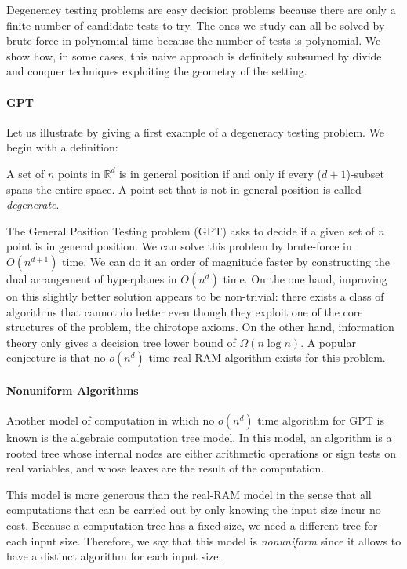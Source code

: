 Degeneracy testing problems are easy decision problems because there are only
a finite number of candidate tests to try. The ones we study can all be solved
by brute-force in polynomial time because the number of tests is polynomial.
We show how, in some cases, this naive approach is definitely subsumed by
divide and conquer techniques exploiting the geometry of the setting.

\paragraph{GPT}
Let us illustrate by giving a first example of a degeneracy testing problem. We
begin with a definition:

\begin{definition}
A set of \(n\) points in \(\mathbb{R}^d\)
is in general position if and only if every (\(d+1\))-subset spans the entire
space. A point set that is not in general position is called \emph{degenerate}.
\end{definition}

The General Position Testing problem (GPT) asks to decide if a given set of
\(n\) point is in general position. We can solve this problem by brute-force in
\(O(n^{d+1})\) time.
We can do it an order of magnitude faster
by constructing the dual arrangement of hyperplanes in
\(O(n^d)\) time.
On the one hand,
improving on this slightly better solution appears to be non-trivial: there
exists a class of algorithms that cannot do better even though they
exploit one of the core structures of the problem, the chirotope axioms.
On the other hand, information theory only gives a decision tree
lower bound of \(\Omega(n \log n)\).
A popular conjecture is that no \(o(n^d)\) time real-RAM
algorithm exists for this problem.

\paragraph{Nonuniform Algorithms}
Another model of computation in which no \(o(n^d)\) time algorithm for GPT
is known is the algebraic computation tree model. In this model,
an algorithm is a rooted tree whose internal nodes are either arithmetic operations or
sign tests on real variables, and whose leaves are the result of the computation.

This model is
more generous than the real-RAM model in the sense that all computations that
can be carried out by only knowing the input size incur no cost.
%
Because a computation tree has a fixed size, we need a different tree for each
input size.
%
Therefore,
we say that this model is \emph{nonuniform} since it allows to have a
distinct algorithm for each input size.

